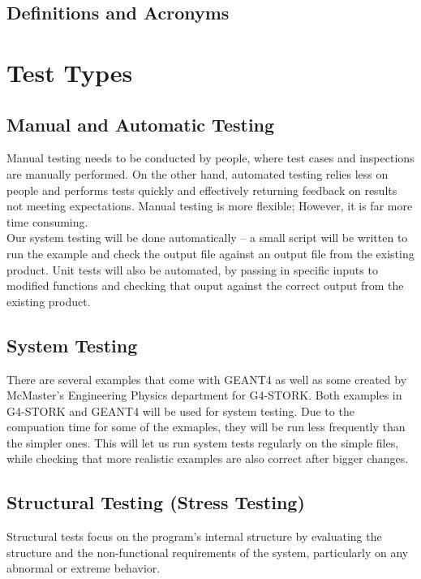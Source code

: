 \documentclass[12pt]{article}
\begin{document}
\subsection{Definitions and Acronyms} %

\section{Test Types}

\subsection{Manual and Automatic Testing} %
Manual testing needs to be conducted by people, where test cases and inspections are manually performed. On the other hand, automated testing relies less on people and performs tests quickly and effectively returning feedback on results not meeting expectations. Manual testing is more flexible; However, it is far more time consuming.\\

Our system testing will be done automatically -- a small script will be written to run the example and check the output file against an output file from the existing product. Unit tests will also be automated, by passing in specific inputs to modified functions and checking that ouput against the correct output from the existing product.\\ 

\subsection{System Testing} %
There are several examples that come with GEANT4 as well as some created by McMaster's Engineering Physics department for G4-STORK. Both examples in G4-STORK and GEANT4 will be used for system testing. Due to the compuation time for some of the exmaples, they will be run less frequently than the simpler ones. This will let us run system tests regularly on the simple files, while checking that more realistic examples are also correct after bigger changes.

\subsection{Structural Testing (Stress Testing)} %
Structural tests focus on the program's internal structure by evaluating the structure and the non-functional requirements of the system, particularly on any abnormal or extreme behavior.\\ 
\end{document}
